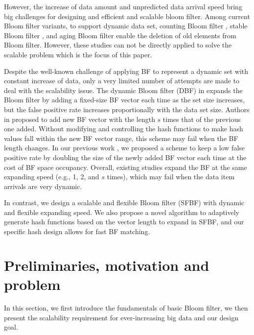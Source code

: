 \documentclass[10pt,journal,compsoc]{IEEEtran}
\begin{document}
However, the increase of data amount and unpredicted data arrival speed bring big challenges for designing and efficient and scalable bloom filter. Among current Bloom filter variants, to support dynamic data set, counting Bloom filter \cite{fan2000summary}, stable Bloom filter \cite{deng2006approximately}, and aging Bloom filter \cite{yoon2010aging} enable the deletion of old elements from Bloom filter. However, these studies can not be directly applied to solve the scalable problem which is the focus of this paper.


Despite the well-known challenge of applying BF to represent a dynamic set with constant increase of data, only a very limited number of attempts are made to deal with the scalability issue.
 The dynamic Bloom filter (DBF) in \cite{guo2006theory, wei2010mad2} expands the Bloom filter by adding a fixed-size BF vector each time as the set size increases, but the false positive rate increases proportionally with the data set size. Authors in \cite{almeida2007scalable} proposed to add new BF vector with the length $s$ times that of the previous one added. Without modifying and controlling the hash functions to make hash values fall within the new BF vector range, this scheme may fail when the BF length changes.
  In our previous work \cite{xie2007scalable}, we proposed a scheme to keep a low false positive rate by doubling the size of the newly added BF vector each time at the cost of BF space occupancy.  Overall, existing studies expand the BF at the same expanding speed (e.g., 1, 2, and $s$ times), which may fail when the data item arrivals are very dynamic.

In contrast, we design a scalable and flexible Bloom filter (SFBF) with dynamic and flexible expanding speed. We also propose a novel algorithm to adaptively generate hash functions based on the vector length to expand in SFBF, and our specific hash design allows for fast BF matching.

\section{Preliminaries, motivation and problem}
\label{sec:Review of Bloom filter}
In this section, we first introduce the fundamentals of basic Bloom filter, we then present the scalability requirement for ever-increasing big data and our design goal.
\end{document}
